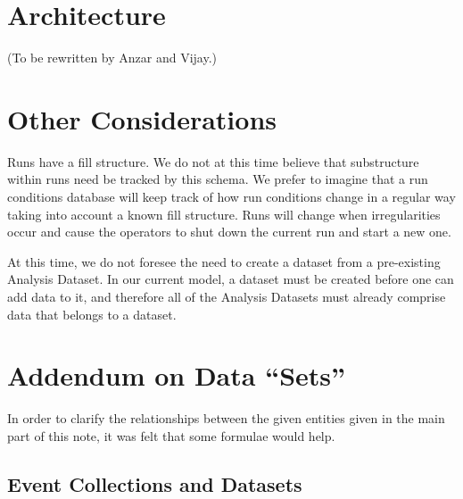 \documentclass{cmspaper}
\begin{document}
\section{Architecture}

(To be rewritten by Anzar and Vijay.)


\section{Other Considerations}

Runs have a fill structure.  We do not at this time believe that substructure within 
runs need be tracked by this schema.  We prefer to imagine that a run conditions 
database will keep track of how run conditions change in a regular way taking into 
account a known fill structure.  Runs will change when irregularities occur and cause 
the operators to shut down the current run and start a new one.  

At this time, we do not foresee the need to create a dataset from a 
pre-existing Analysis Dataset.  In our current model, a dataset must be created 
before one can add data to it, and therefore all of the Analysis Datasets must 
already comprise data that belongs to a dataset.  


\appendix

\section{Addendum on Data ``Sets''}\label{appendix}

In order to clarify the relationships between the given entities given in the main part of 
this note, it was felt that some formulae would help. 

\subsection{Event Collections and Datasets}
\end{document}
